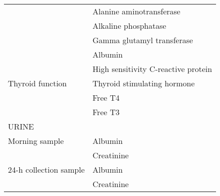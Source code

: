 \begin{table}[H]
\begin{tabular}{ll}
                           & Alanine aminotransferase            \\
                           & Alkaline phosphatase                \\
                           & Gamma glutamyl transferase          \\
                           & Albumin                             \\
                           & High sensitivity C-reactive protein \\
    Thyroid function       & Thyroid stimulating hormone         \\
                           & Free T4                             \\
                           & Free T3                             \\
    \multicolumn{2}{l}{URINE}                                    \\
    Morning sample         & Albumin                             \\
                           & Creatinine                          \\
    24-h collection sample & Albumin                             \\
                           & Creatinine                         
    \end{tabular}
    \label{table:appendix:data_overview_clinical_measures}
\end{table}